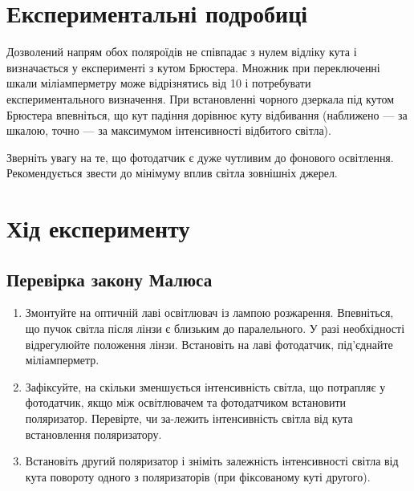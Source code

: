 \section{Експериментальні подробиці}

Дозволений напрям обох поляроїдів не співпадає з нулем відліку кута і визначається у експерименті з кутом Брюстера. Множник при переключенні шкали міліамперметру може відрізнятись від 10 і потребувати експериментального визначення.
При встановленні чорного дзеркала під кутом Брюстера впевніться, що кут падіння
дорівнює куту відбивання (наближено --- за шкалою, точно --- за максимумом інтенсивності відбитого світла).

Зверніть увагу на те, що фотодатчик є дуже чутливим до фонового освітлення. Рекомендується
звести до мінімуму вплив світла зовнішніх джерел.

\section{Хід експерименту}

\subsection{Перевірка закону Малюса}
\begin{enumerate}
\item Змонтуйте на оптичній лаві освітлювач із лампою розжарення. Впевніться, що пучок світла після лінзи є близьким до паралельного. У разі необхідності відрегулюйте положення лінзи. Встановіть на лаві фотодатчик, під’єднайте міліамперметр.
\item Зафіксуйте, на скільки зменшується інтенсивність світла, що потрапляє у фотодатчик, якщо між освітлювачем та фотодатчиком встановити поляризатор. Перевірте, чи за-лежить інтенсивність світла від кута встановлення поляризатору.
\item \label{item:MaluseLaw}Встановіть другий поляризатор і зніміть залежність інтенсивності світла від кута повороту одного з поляризаторів (при фіксованому куті другого).
\end{enumerate}

